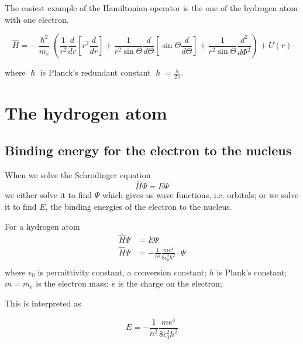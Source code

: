\documentclass[../mit-general-chemistry.tex]{subfiles}
\begin{document}
\begin{remark}
  The easiest example of the Hamiltonian operator is the one of the
  hydrogen atom with one electron.

  {\footnotesize
    \begin{equation}
      \hat{H} =
      -\frac{\hslash^2}{m_e}
      \left(
      \frac{1}{r^2}
      \frac{d}{dr}
      \left[
        r^2\frac{d}{dr}
        \right]
      + \frac{1}{r^2\sin\Theta}\frac{d}{d\Theta}
      \left[
        \sin\Theta\frac{d}{d\Theta}
        \right]
      +\frac{1}{r^2\sin\Theta}\frac{d^2}{d\Phi^2}
      \right)
      + U(r)
    \end{equation}
  }

  where $\hslash$ is Planck's redundant constant $\hslash = \frac{h}{2\pi}$.

\end{remark}








\section{The hydrogen atom}



\subsection{Binding energy for the electron to the nucleus}

When we solve the Schrodinger equation
\begin{equation}
  \hat{H}\Psi = E \Psi
\end{equation}
we either solve it to find $\Psi$ which gives us wave functions,
i.e. orbitals; or we solve it to find $E$, the binding energies of the
electron to the nucleus.

For a hydrogen atom
\begin{align*}
  \hat{H}\Psi &= E \Psi \\
  \hat{H}\Psi &= -\frac{1}{n^2}\frac{me^4}{8\epsilon_0^2h^2} \cdot \Psi \\
\end{align*}
where $\epsilon_0$ is permittivity constant, a conversion constant;
$h$ is Plank's constant; $m = m_e$ is the electron mass; $e$ is the
charge on the electron;

This is interpreted as

\begin{equation}
  E = -\frac{1}{n^2}\frac{me^4}{8\epsilon_0^2h^2}
\end{equation}
\end{document}
